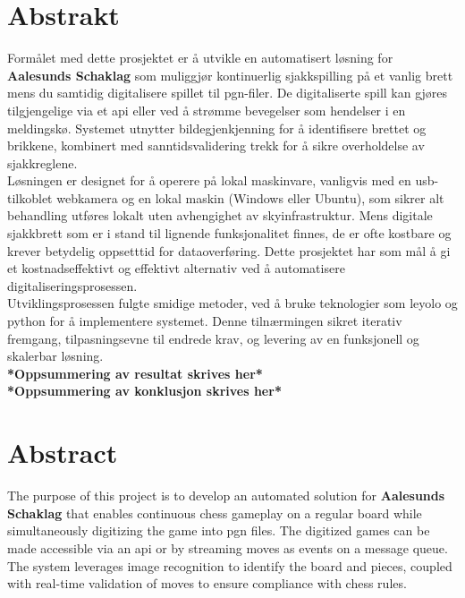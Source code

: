 \chapter*{Abstrakt}

Formålet med dette prosjektet er å utvikle en automatisert løsning for \textbf{Aalesunds Schaklag} som muliggjør kontinuerlig sjakkspilling på et vanlig brett mens du samtidig digitalisere spillet til \gls{pgn}-filer. De digitaliserte spill kan gjøres tilgjengelige via et \gls{api} eller ved å strømme bevegelser som hendelser i en meldingskø. Systemet utnytter bildegjenkjenning for å identifisere brettet og brikkene, kombinert med sanntidsvalidering trekk for å sikre overholdelse av sjakkreglene. \\

Løsningen er designet for å operere på lokal maskinvare, vanligvis med en \acrshort{usb}-tilkoblet webkamera og en lokal maskin (Windows eller Ubuntu), som sikrer alt behandling utføres lokalt uten avhengighet av skyinfrastruktur. Mens digitale sjakkbrett som er i stand til lignende funksjonalitet finnes, de er ofte kostbare og krever betydelig oppsetttid for dataoverføring. Dette prosjektet har som mål å gi et kostnadseffektivt og effektivt alternativ ved å automatisere digitaliseringsprosessen. \\

Utviklingsprosessen fulgte smidige metoder, ved å bruke teknologier som \gls{leyolo} og \gls{python} for å implementere systemet. Denne tilnærmingen sikret iterativ fremgang, tilpasningsevne til endrede krav, og levering av en funksjonell og skalerbar løsning. \\

\textbf{*Oppsummering av resultat skrives her*}\\

\textbf{*Oppsummering av konklusjon skrives her*}


\newpage


\chapter*{Abstract}

The purpose of this project is to develop an automated solution for \textbf{Aalesunds Schaklag} that enables continuous chess gameplay on a regular board while simultaneously digitizing the game into \gls{pgn} files. The digitized games can be made accessible via an \gls{api} or by streaming moves as events on a message queue. The system leverages image recognition to identify the board and pieces, coupled with real-time validation of moves to ensure compliance with chess rules.\\

